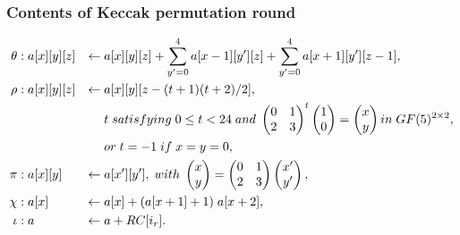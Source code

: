 \documentclass{beamer}
\begin{document}
\begin{frame}
\frametitle{Contents of Keccak permutation round}
\begin{align*}
  \theta &: a[x][y][z] & \gets & \thickspace a[x][y][z] + \displaystyle\sum\limits_{y' = 0}^{4} a[x - 1][y'][z] + \displaystyle\sum\limits_{y' = 0}^{4} a[x + 1][y'][z - 1], \\
  \rho &: a[x][y][z] & \gets & \thickspace a[x][y][z - (t + 1)(t + 2) / 2], \\
  & & & \thickspace t \thickspace satisfying \thickspace 0 \leq t < 24 \thickspace and \thickspace
  \begin{pmatrix} 0 & 1 \\ 2 & 3 \end{pmatrix}^{t} \begin{pmatrix} 1 \\ 0 \end{pmatrix} = \begin{pmatrix} x \\ y \end{pmatrix}
  in \thickspace GF(5)^{2 \times 2}, \\
  & & & \thickspace or \thickspace t = -1 \thickspace if \thickspace x = y = 0, \\
  \pi &: a[x][y] & \gets & \thickspace a[x'][y'], \thickspace with \thickspace
  \begin{pmatrix} x \\ y \end{pmatrix} = \begin{pmatrix} 0 & 1 \\ 2 & 3 \end{pmatrix} \begin{pmatrix} x' \\ y'\end{pmatrix}, \\
  \chi &: a[x] & \gets & \thickspace a[x] + (a[x + 1] + 1) \thickspace a[x + 2], \\
  \iota &: a & \gets & \thickspace a + RC[i_{r}].
\end{align*}
\end{frame}
\end{document}
